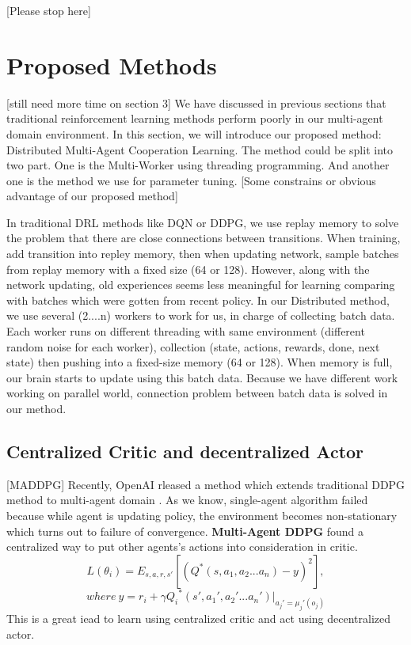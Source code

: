 \documentclass[11pt,twocolumn]{jarticle} %
\begin{document}
[Please stop here]
\section{Proposed Methods}[still need more time on section 3]
We have discussed in previous sections that traditional reinforcement learning methods perform poorly in our multi-agent domain environment. In this section, we will introduce our proposed method: Distributed Multi-Agent Cooperation Learning. The method could be split into two part. One is the Multi-Worker using threading programming. And another one is the method we use for parameter tuning.
[Some constrains or obvious advantage of our proposed method]

In traditional DRL methods like DQN or DDPG, we use replay memory to solve the problem that there are close connections between transitions. When training, add transition into repley memory, then when updating network, sample batches from replay memory with a fixed size (64 or 128). However, along with the network updating, old experiences seems less meaningful for learning comparing with batches which were gotten from recent policy. 
In our Distributed method, we use several (2....n) workers to work for us, in charge of collecting batch data. Each worker runs on different threading with same environment (different random noise for each worker), collection (state, actions, rewards, done, next state) then pushing into a fixed-size memory (64 or 128). When memory is full, our brain starts to update using this batch data. Because we have different work working on parallel world, connection problem between batch data is solved in our method.  

\subsection{Centralized Critic and decentralized Actor}
[MADDPG]
Recently, OpenAI rleased a method which extends traditional DDPG method to multi-agent domain \cite{4}. As we know, single-agent algorithm failed because while agent is updating policy, the environment becomes non-stationary which turns out to failure of convergence. \textbf{Multi-Agent DDPG} found a centralized way to put other agents's actions into consideration in critic.
\begin{equation}
L(\theta_i) = E_{s,a,r,s'}[(Q^*(s, a_1, a_2 ... a_n) - y)^2],  
\end{equation}
$$where\ y = r_i + \gamma{Q_i}^*(s', a_1', a_2' ... a_n') | _{a_j'=\mu_j'(o_j)}$$
This is a great iead to learn using centralized critic and act using decentralized actor. 
\end{document}
